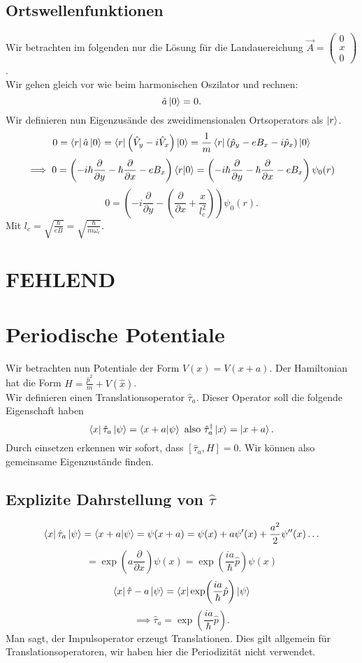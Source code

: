 \documentclass{report}
\begin{document}
\subsection{Ortswellenfunktionen}
Wir betrachten im folgenden nur die Lösung für die Landauereichung $\vec{A} = \begin{pmatrix} 0 \\ x \\ 0 \end{pmatrix} $. \\
Wir gehen gleich vor wie beim harmonischen Oszilator und rechnen: \[
\hat{a} \ket{0} = 0
.\] Wir definieren nun Eigenzusände des zweidimensionalen Ortsoperators als $\ket{r} $. \[
0 = \bra{r} \hat{a} \ket{0} = \bra{r}  \left( \hat{V}_y - i \hat{V}_x \right) \ket{0} = \frac{1}{m} \bra{r} \left( \hat{p}_y - eB_x - i\hat{p}_x \right) \ket{0} 
\] \[
\implies 0 = \left( -i\hbar \frac{\partial}{\partial y} - \hbar \frac{\partial}{\partial x} - e B_x \right) \bra{r} \ket{0}  = \left( -i\hbar \frac{\partial}{\partial y} - \hbar \frac{\partial}{\partial x} - e B_x \right) \psi_0(r)
\] \[
0 = \left( -i \frac{\partial}{\partial y} - \left( \frac{\partial}{\partial x} + \frac{x}{l_c^2} \right)  \right) \psi_0(r) 
.\] Mit $l_c = \sqrt{\frac{\hbar }{eB}} = \sqrt{\frac{\hbar}{m\omega_c}} $. 
\section{FEHLEND}
\section{Periodische Potentiale}
Wir betrachten nun Potentiale der Form $V(x) = V(x+a)$. Der Hamiltonian hat die Form  $H = \frac{\hat{p}^2}{m} + V(\hat{x})$. \\
Wir definieren einen Translationsoperator $\hat{\tau}_a$. Dieser Operator soll die folgende Eigenschaft haben \[
\bra{x} \hat{\tau}_a \ket{\psi } = \bra{x+a} \ket{\psi } \text{ also } \hat{\tau}_a^\dagger \ket{x} = \ket{x+a}  
.\] Durch einsetzen erkennen wir sofort, dass $[\hat{\tau}_a, H] = 0$. Wir können also gemeinsame Eigenzustände finden.  
\subsection{Explizite Dahrstellung von $\hat{\tau}$ }
\[
	\bra{x} \hat{\tau}_a \ket{\psi } = \bra{x+a} \ket{\psi } = \psi(x+a) = \psi(x) + a \psi'(x) + \frac{a^2}{2} \psi''(x) \ldots
\] \[
= \exp(a \frac{\partial}{\partial x}) \psi(x) = \exp(\frac{ia}{\hbar } \hat{p})\psi(x)
\] \[
\bra{x} \hat{\tau}-a \ket{\psi } = \bra{x} \exp(\frac{ia}{\hbar} \hat{p}) \ket{\psi } 
\] \[
\implies \hat{\tau}_a = \exp(\frac{ia}{\hbar }\hat{p})
.\]    Man sagt, der Impulsoperator erzeugt Translationen. Dies gilt allgemein für Translationsoperatoren, wir haben hier die Periodizität nicht verwendet.
\end{document}
